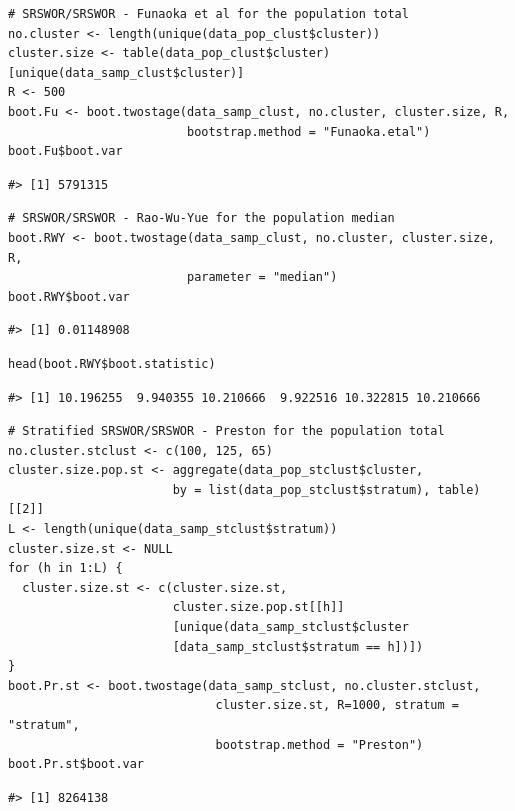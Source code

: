 \begin{verbatim}
# SRSWOR/SRSWOR - Funaoka et al for the population total
no.cluster <- length(unique(data_pop_clust$cluster))
cluster.size <- table(data_pop_clust$cluster)[unique(data_samp_clust$cluster)]
R <- 500
boot.Fu <- boot.twostage(data_samp_clust, no.cluster, cluster.size, R, 
                         bootstrap.method = "Funaoka.etal")
boot.Fu$boot.var
\end{verbatim}

\begin{verbatim}
#> [1] 5791315
\end{verbatim}

\begin{verbatim}
# SRSWOR/SRSWOR - Rao-Wu-Yue for the population median
boot.RWY <- boot.twostage(data_samp_clust, no.cluster, cluster.size, R,
                         parameter = "median")
boot.RWY$boot.var
\end{verbatim}

\begin{verbatim}
#> [1] 0.01148908
\end{verbatim}

\begin{verbatim}
head(boot.RWY$boot.statistic)
\end{verbatim}

\begin{verbatim}
#> [1] 10.196255  9.940355 10.210666  9.922516 10.322815 10.210666
\end{verbatim}

\begin{verbatim}
# Stratified SRSWOR/SRSWOR - Preston for the population total
no.cluster.stclust <- c(100, 125, 65)
cluster.size.pop.st <- aggregate(data_pop_stclust$cluster,
                       by = list(data_pop_stclust$stratum), table)[[2]]
L <- length(unique(data_samp_stclust$stratum))
cluster.size.st <- NULL
for (h in 1:L) {
  cluster.size.st <- c(cluster.size.st,
                       cluster.size.pop.st[[h]]
                       [unique(data_samp_stclust$cluster
                       [data_samp_stclust$stratum == h])])
}
boot.Pr.st <- boot.twostage(data_samp_stclust, no.cluster.stclust,
                             cluster.size.st, R=1000, stratum = "stratum",
                             bootstrap.method = "Preston")
boot.Pr.st$boot.var
\end{verbatim}

\begin{verbatim}
#> [1] 8264138
\end{verbatim}

